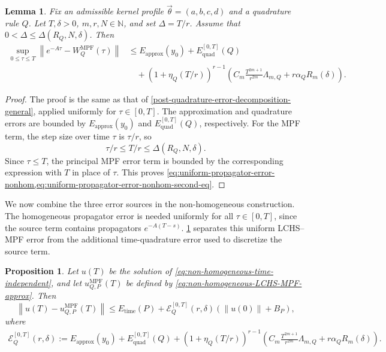 \documentclass[10pt,reqno]{article}
\numberwithin{equation}{section}
\theoremstyle{plain}
\newtheorem{lem}[thm]{Lemma}
\newtheorem{prop}[thm]{Proposition}
\theoremstyle{definition}
\begin{document}
\begin{lem}\label{lem:uniform-propagator-error-nonhom}
Fix an admissible kernel profile \(\vec{\theta}=(a,b,c,d)\) and a quadrature rule \(Q\). Let \(T,\delta>0\), \(m,r,N\in\mathbb N\), and set \(\Delta=T/r\). Assume that \(0<\Delta\leq\Delta(R_Q,N,\delta)\). Then
\begin{align}\label{eq:uniform-propagator-error-nonhom}
\sup_{0\leq\tau\leq T}\left\|e^{-A\tau}-W_Q^{\operatorname{MPF}}(\tau)\right\| &\le E_{\operatorname{approx}}(y_0)+E_{\operatorname{quad}}^{[0,T]}(Q) \\ &\quad +(1+\eta_Q(T/r))^{r-1}\left(C_m\frac{T^{2m+1}}{r^{2m}}\Lambda_{m,Q}+r\alpha_QR_m(\delta)\right).
\label{eq:uniform-propagator-error-nonhom-second-eq}
\end{align}
\end{lem}

\begin{proof}
The proof is the same as that of \cref{post-quadrature-error-decomposition-general}, applied uniformly for \(\tau\in[0,T]\). The approximation and quadrature errors are bounded by \(E_{\operatorname{approx}}(y_0)\) and \(E_{\operatorname{quad}}^{[0,T]}(Q)\), respectively. For the MPF term, the step size over time \(\tau\) is \(\tau/r\), so
\begin{equation}
\tau/r\leq T/r\leq \Delta(R_Q,N,\delta).
\end{equation}
Since \(\tau\leq T\), the principal MPF error term is bounded by the corresponding expression with \(T\) in place of \(\tau\). This proves \cref{eq:uniform-propagator-error-nonhom,eq:uniform-propagator-error-nonhom-second-eq}.
\end{proof}

We now combine the three error sources in the non-homogeneous construction. The homogeneous propagator error is needed uniformly for all \(\tau\in[0,T]\), since the source term contains propagators \(e^{-A(T-s)}\). \cref{prop:non-homogeneous-error-bound} separates this uniform LCHS--MPF error from the additional time-quadrature error used to discretize the source term.

\begin{prop}\label{prop:non-homogeneous-error-bound}
Let \(u(T)\) be the solution of \cref{eq:non-homogeneous-time-independent}, and let \(u_{Q,P}^{\operatorname{MPF}}(T)\) be defined by \cref{eq:non-homogeneous-LCHS-MPF-approx}. Then
\begin{equation}\label{eq:non-homogeneous-error-bound}
\left\|u(T)-u_{Q,P}^{\operatorname{MPF}}(T)\right\| \leq E_{\operatorname{time}}(P)+\mathcal E_Q^{[0,T]}(r,\delta)\left(\|u(0)\|+B_P\right),
\end{equation}
where
\begin{align}\label{eq:uniform-EQ-def}
\mathcal E_Q^{[0,T]}(r,\delta) := E_{\operatorname{approx}}(y_0)+E_{\operatorname{quad}}^{[0,T]}(Q)+(1+\eta_Q(T/r))^{r-1}\left(C_m\frac{T^{2m+1}}{r^{2m}}\Lambda_{m,Q}+r\alpha_QR_m(\delta)\right).
\end{align}
\end{prop}
\end{document}
